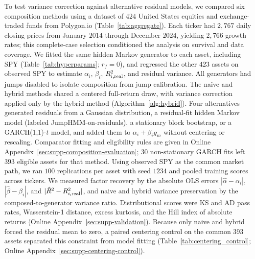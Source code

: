 To test variance correction against alternative residual models, we
compared six composition methods using a dataset of $424$ United
States equities and exchange-traded funds from Polygon.io (Table~\ref{tab:aggregate}).
Each ticker had $2{,}767$ daily closing prices from January $2014$
through December $2024$, yielding $2{,}766$ growth rates; this
complete-case selection conditioned the analysis on survival and data
coverage. We fitted the same hidden Markov generator to each asset,
including SPY (Table~\ref{tab:hyperparams}; $r_f=0$), and regressed
the other $423$ assets on observed SPY to estimate $\alpha_i$,
$\beta_i$, $R^2_{i,\mathrm{real}}$, and residual variance. All generators
had jumps disabled to isolate composition from jump calibration. The
naive and hybrid methods shared a centered full-return draw, with
variance correction applied only by the hybrid method
(Algorithm~\ref{alg:hybrid}). Four alternatives generated residuals
from a Gaussian distribution, a residual-fit hidden Markov model
(labeled JumpHMM-on-residuals), a stationary block bootstrap, or a
GARCH(1,1)-$t$ model, and added them to $\alpha_i+\beta_i g_m$
without centering or rescaling. Comparator fitting and eligibility
rules are given in Online Appendix~\ref{sec:supp-composition-evaluation};
$30$ non-stationary GARCH fits left $393$ eligible assets for that
method. Using observed SPY as the common market path, we ran $100$
replications per asset with seed $1234$ and pooled training scores
across tickers. We measured factor recovery by the absolute OLS
errors $|\hat\alpha-\alpha_i|$, $|\hat\beta-\beta_i|$, and
$|\hat R^2-R^2_{i,\mathrm{real}}|$, and naive and hybrid variance preservation
by the composed-to-generator variance ratio. Distributional scores
were KS and AD pass rates, Wasserstein-1 distance, excess kurtosis,
and the Hill index of absolute returns (Online
Appendix~\ref{sec:supp-validation}). Because only naive and hybrid
forced the residual mean to zero, a paired centering control on the
common $393$ assets separated this constraint from model fitting
(Table~\ref{tab:centering_control}; Online
Appendix~\ref{sec:supp-centering-control}).

